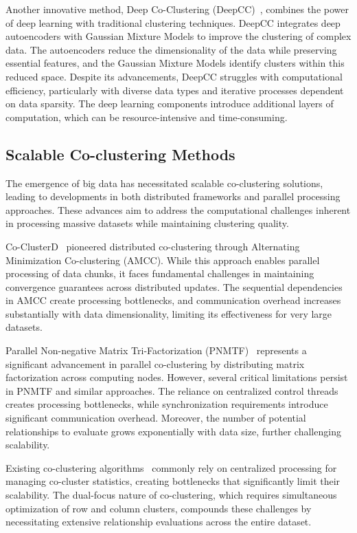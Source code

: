 \documentclass[journal]{IEEEtran}
\renewcommand{\cite}[1]{~\autocite{#1}}
\begin{document}
Another innovative method, Deep Co-Clustering (DeepCC)\cite{dongkuanxu2019DeepCoClustering}, combines the power of deep learning with traditional clustering techniques. DeepCC integrates deep autoencoders with Gaussian Mixture Models to improve the clustering of complex data. The autoencoders reduce the dimensionality of the data while preserving essential features, and the Gaussian Mixture Models identify clusters within this reduced space. Despite its advancements, DeepCC struggles with computational efficiency, particularly with diverse data types and iterative processes dependent on data sparsity. The deep learning components introduce additional layers of computation, which can be resource-intensive and time-consuming.

\subsection{Scalable Co-clustering Methods}
The emergence of big data has necessitated scalable co-clustering solutions, leading to developments in both distributed frameworks and parallel processing approaches. These advances aim to address the computational challenges inherent in processing massive datasets while maintaining clustering quality.

Co-ClusterD\cite{cheng2015CoClusterDDistributedFramework} pioneered distributed co-clustering through Alternating Minimization Co-clustering (AMCC). While this approach enables parallel processing of data chunks, it faces fundamental challenges in maintaining convergence guarantees across distributed updates. The sequential dependencies in AMCC create processing bottlenecks, and communication overhead increases substantially with data dimensionality, limiting its effectiveness for very large datasets.

Parallel Non-negative Matrix Tri-Factorization (PNMTF)\cite{chen2023ParallelNonNegativeMatrix} represents a significant advancement in parallel co-clustering by distributing matrix factorization across computing nodes. However, several critical limitations persist in PNMTF and similar approaches. The reliance on centralized control threads creates processing bottlenecks, while synchronization requirements introduce significant communication overhead. Moreover, the number of potential relationships to evaluate grows exponentially with data size, further challenging scalability.

Existing co-clustering algorithms\cite{chen2023ParallelNonNegativeMatrix, cheng2015CoClusterDDistributedFramework} commonly rely on centralized processing for managing co-cluster statistics, creating bottlenecks that significantly limit their scalability. The dual-focus nature of co-clustering, which requires simultaneous optimization of row and column clusters, compounds these challenges by necessitating extensive relationship evaluations across the entire dataset.
\end{document}
